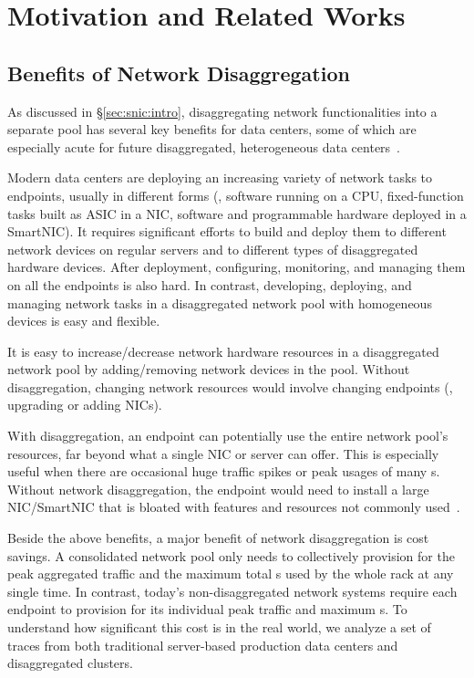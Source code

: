\section{Motivation and Related Works}
\label{sec:snic:motivation}

\subsection{Benefits of Network Disaggregation}
\label{sec:snic:benefits}
As discussed in \S\ref{sec:snic:intro}, disaggregating network functionalities into a separate pool has several key benefits for data centers, some of which are especially acute for future disaggregated, heterogeneous data centers~\cite{Shan18-OSDI,last-cpu-hotos, FratOS-eurosys}.

Modern data centers are deploying an increasing variety of network tasks to endpoints, usually in different forms (\eg, software running on a CPU, fixed-function tasks built as ASIC in a NIC, software and programmable hardware deployed in a SmartNIC). 
It requires significant efforts to build and deploy them to different network devices on regular servers and to different types of disaggregated hardware devices.
After deployment, configuring, monitoring, and managing them on all the endpoints is also hard.
In contrast, developing, deploying, and managing network tasks in a disaggregated network pool with homogeneous devices is easy and flexible.

It is easy to increase/decrease network hardware resources in a disaggregated network pool by adding/removing network devices in the pool. Without disaggregation, changing network resources would involve changing endpoints (\eg, upgrading or adding NICs).

With disaggregation, an endpoint can potentially use the entire network pool's resources, far beyond what a single NIC or server can offer.
This is especially useful when there are occasional huge traffic spikes or peak usages of many \nt{}s.
Without network disaggregation, the endpoint would need to install a large NIC/SmartNIC that is bloated with features and resources not commonly used~\cite{SmartNIC-nsdi18,Caulfield-2018}.

Beside the above benefits, a major benefit of network disaggregation is cost savings. A consolidated network pool only needs to collectively provision for the peak aggregated traffic and the maximum total \nt{}s used by the whole rack at any single time.
In contrast, today's non-disaggregated network systems require each endpoint to provision for its individual peak traffic and maximum \nt{}s.
To understand how significant this cost is in the real world, we analyze a set of traces from both traditional server-based production data centers and disaggregated clusters.

